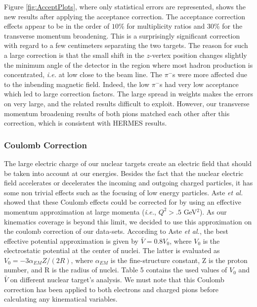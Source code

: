 Figure \ref{fig:AcceptPlots}, where only statistical errors are 
represented, shows the new results after applying the acceptance correction.
The acceptance correction effects appear to be in the order of $10$\% for 
multiplicity ratios and $30$\% for the transverse momentum broadening. This is a surprisingly significant correction with regard to a few centimeters separating the two targets. The reason for such a large correction is that the small shift in the $z$-vertex position changes slightly the minimum angle of the detector in the region where most hadron production is concentrated, {\it i.e.} at low \pt close to the beam line. The $\pi^-$s were more affected due to the inbending magnetic field. Indeed, the low \pt $\pi^-$s had very low acceptance which led to large correction factors. The large spread in weights makes the errors on \dpt very large, and the related results difficult to exploit. However, our transverse momentum broadening results of both pions matched each other after this correction, which is consistent 
with HERMES results.

\subsubsection{Coulomb Correction}
\label{CCor}

The large electric charge of our nuclear targets create an electric field that should be taken into account at our energies. Besides the fact that the nuclear electric field accelerates or decelerates the incoming and outgoing charged particles, it has some non trivial effects such as the focusing of low energy particles. Aste {\it et al.}~\cite{Aste:2005wc} showed that these Coulomb effects could be corrected for by using an effective momentum approximation at large momenta ({\it i.e.}, $Q^2>.5$ GeV$^2$). As our kinematics coverage is beyond this limit, we decided to use this approximation on the coulomb correction of our data-sets. According to Aste {\it et al.}, the best effective potential approximation is given by $\bar V= 0.8 V_0$, where $V_0$ is the electrostatic potential at the center of nuclei. The latter is evaluated as $V_0= -3 \alpha_{EM} Z / (2 R)$, where $\alpha_{EM}$ is the fine-structure constant, Z is the proton number, and R is the radius of nuclei. Table 5 contains the used values of $V_0$ and $\bar V$ on different nuclear target's analysis. We must note that this Coulomb correction has been applied to both electrons and charged pions before calculating any kinematical variables.

